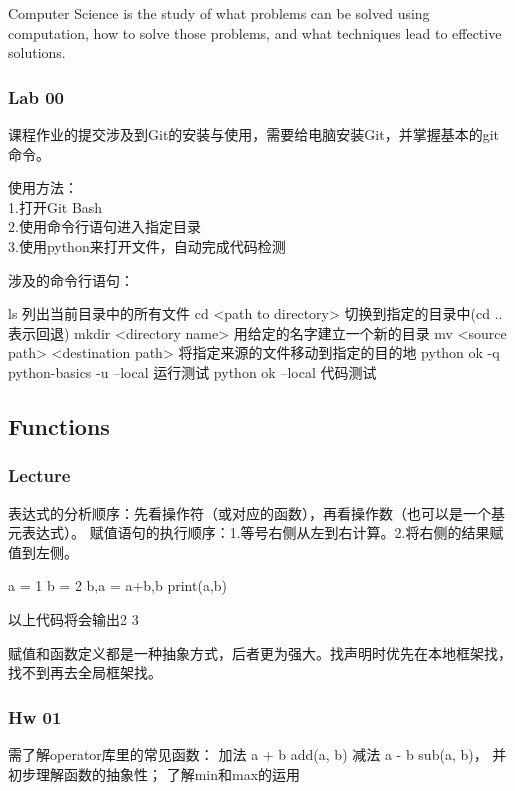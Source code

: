 \documentclass{ctexart}
\begin{document}
Computer Science is the study of 
what problems can be solved using computation,
how to solve those problems, and
what techniques lead to effective solutions.

\subsubsection{Lab 00}
课程作业的提交涉及到Git的安装与使用，需要给电脑安装Git，并掌握基本的git命令。

使用方法：\\1.打开Git Bash\\2.使用命令行语句进入指定目录\\
3.使用python来打开文件，自动完成代码检测

涉及的命令行语句：
\begin{python}
    ls 列出当前目录中的所有文件
    cd <path to directory> 切换到指定的目录中(cd .. 表示回退)
    mkdir <directory name> 用给定的名字建立一个新的目录
    mv <source path> <destination path> 将指定来源的文件移动到指定的目的地
    python ok -q python-basics -u --local 运行测试
    python ok --local 代码测试
\end{python}

\subsection{Functions}

\subsubsection{Lecture}

表达式的分析顺序：先看操作符（或对应的函数），再看操作数（也可以是一个基元表达式）。
赋值语句的执行顺序：1.等号右侧从左到右计算。2.将右侧的结果赋值到左侧。

\begin{python}
    a = 1
    b = 2
    b,a = a+b,b
    print(a,b)
\end{python}
以上代码将会输出2 3

赋值和函数定义都是一种抽象方式，后者更为强大。找声明时优先在本地框架找，找不到再去全局框架找。

\subsubsection{Hw 01}

需了解operator库里的常见函数：
加法 a + b add(a, b)  减法 a - b sub(a, b)，
并初步理解函数的抽象性；
了解min和max的运用
\end{document}
